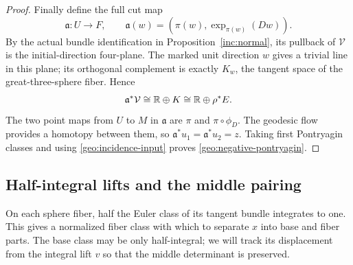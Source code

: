 \begin{proof}
Finally define the full cut map
\[
 \mathfrak a:U\longrightarrow F,
 \qquad \mathfrak a(w)=(\pi(w),\exp_{\pi(w)}(Dw)).
\]
By the actual bundle identification in
Proposition~\ref{inc:normal}, its pullback of $\mathcal V$
is the initial-direction four-plane.  The marked unit direction
$w$ gives a trivial line in this plane; its orthogonal complement
is exactly $K_w$, the tangent space of the great-three-sphere
fiber.  Hence
\[
 \mathfrak a^*\mathcal V\cong\mathbb R\oplus K
 \cong\mathbb R\oplus\rho^*E.
\]
The two point maps from $U$ to $M$ in $\mathfrak a$ are
$\pi$ and $\pi\circ\phi_D$.  The geodesic flow provides a
homotopy between them, so
$\mathfrak a^*u_1=\mathfrak a^*u_2=z$.
Taking first Pontryagin classes and using
\eqref{geo:incidence-input} proves
\eqref{geo:negative-pontryagin}.
\end{proof}

\subsection{Half-integral lifts and the middle pairing}

On each sphere fiber, half the Euler class of its tangent bundle
integrates to one.  This gives a normalized fiber class with which
to separate $x$ into base and fiber parts.  The base class may be
only half-integral; we will track its displacement from the integral
lift $v$ so that the middle determinant is preserved.


